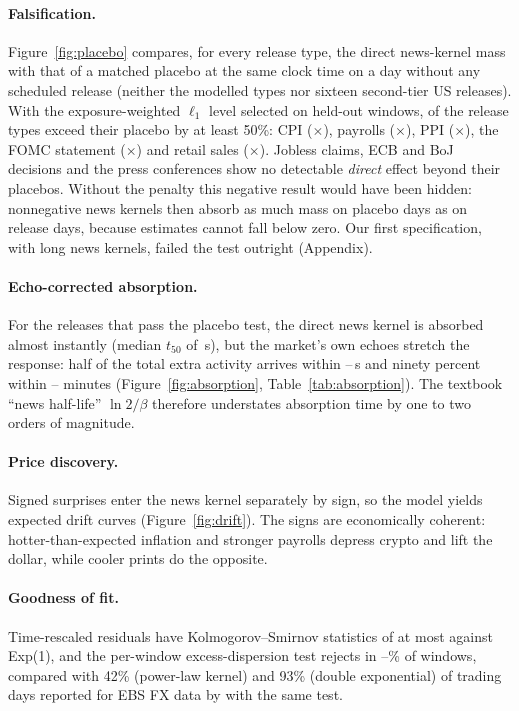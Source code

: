 \paragraph{Falsification.} Figure~\ref{fig:placebo} compares, for every release type, the
direct news-kernel mass with that of a matched placebo at the same clock time on a day
without any scheduled release (neither the \nKinds{} modelled types nor sixteen second-tier
US releases). With the exposure-weighted $\ell_1$ level selected on held-out windows,
\nPassPlacebo{} of the \nKinds{} release types exceed their placebo by at least 50\%: CPI
(\placeboCpi$\times$), payrolls (\placeboNfp$\times$), PPI (\placeboPpi$\times$), the FOMC
statement (\placeboFomc$\times$) and retail sales (\placeboRetail$\times$). Jobless claims,
ECB and BoJ decisions and the press conferences show no detectable \emph{direct} effect beyond
their placebos. Without the penalty this negative result would have been hidden: nonnegative
news kernels then absorb as much mass on placebo days as on release days, because estimates
cannot fall below zero. Our first specification, with long news kernels, failed the test
outright (Appendix).

\paragraph{Echo-corrected absorption.} For the releases that pass the placebo test, the
direct news kernel is absorbed almost instantly (median $t_{50}$ of \tDirMed{}\,s), but the
market's own echoes stretch the response: half of the total extra activity arrives within
\tEchoLo--\tEchoHi{}\,s and ninety percent within \tNinetyLo--\tNinetyHi{} minutes
(Figure~\ref{fig:absorption}, Table~\ref{tab:absorption}). The textbook ``news
half-life'' $\ln 2/\beta$ therefore understates absorption time by one to two orders of
magnitude.

\paragraph{Price discovery.} Signed surprises enter the news kernel separately by sign, so
the model yields expected drift curves (Figure~\ref{fig:drift}). The signs are economically
coherent: hotter-than-expected inflation and stronger payrolls depress crypto and lift the
dollar, while cooler prints do the opposite.

\paragraph{Goodness of fit.} Time-rescaled residuals have Kolmogorov--Smirnov statistics of
at most \ksMax{} against Exp(1), and the per-window excess-dispersion test rejects in
\edLo--\edHi\% of windows, compared with 42\% (power-law kernel) and 93\% (double
exponential) of trading days reported for EBS FX data by \citet{rambaldi2015modeling} with
the same test.

